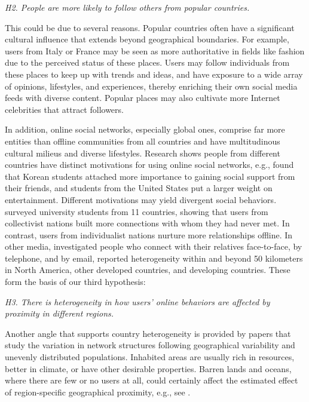 \textit{H2. People are more likely to follow others from popular countries.}

This could be due to several reasons. Popular countries often have a significant cultural influence that extends beyond geographical boundaries. For example, users from Italy or France may be seen as more authoritative in fields like fashion due to the perceived status of these places. Users may follow individuals from these places to keep up with trends and ideas, and have exposure to a wide array of opinions, lifestyles, and experiences, thereby enriching their own social media feeds with diverse content. Popular places may also cultivate more Internet celebrities that attract followers.

In addition, online social networks, especially global ones, comprise far more entities than offline communities from all countries and have multitudinous cultural milieus and diverse lifestyles. Research shows people from different countries have distinct motivations for using online social networks, e.g., \cite{kim2011cultural} found that Korean students attached more importance to gaining social support from their friends, and students from the United States put a larger weight on entertainment. Different motivations may yield divergent social behaviors. \cite{cardon2009online} surveyed university students from 11 countries, showing that users from collectivist nations built more connections with whom they had never met. In contrast, users from individualist nations nurture more relationships offline. In other media, \cite{chen2002global} investigated people who connect with their relatives face-to-face, by telephone, and by email, reported heterogeneity within and beyond 50 kilometers in North America, other developed countries, and developing countries. These form the basis of our third hypothesis:

\textit{H3. There is heterogeneity in how users' online behaviors are affected by proximity in different regions. }

Another angle that supports country heterogeneity is provided by papers that study the variation in network structures following geographical variability and unevenly distributed populations. Inhabited areas are usually rich in resources, better in climate, or have other desirable properties. Barren lands and oceans, where there are few or no users at all, could certainly affect the estimated effect of region-specific geographical proximity, e.g., see \cite{butts2012geographical}.

